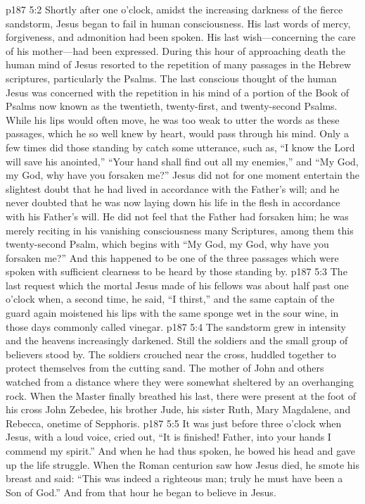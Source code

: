 \vs p187 5:2 Shortly after one o’clock, amidst the increasing darkness of the fierce sandstorm, Jesus began to fail in human consciousness. His last words of mercy, forgiveness, and admonition had been spoken. His last wish---concerning the care of his mother---had been expressed. During this hour of approaching death the human mind of Jesus resorted to the repetition of many passages in the Hebrew scriptures, particularly the Psalms. The last conscious thought of the human Jesus was concerned with the repetition in his mind of a portion of the Book of Psalms now known as the twentieth, twenty\hyp{}first, and twenty\hyp{}second Psalms. While his lips would often move, he was too weak to utter the words as these passages, which he so well knew by heart, would pass through his mind. Only a few times did those standing by catch some utterance, such as, \textcolor{ubdarkred}{“I know the Lord will save his anointed,” “Your hand shall find out all my enemies,”} and \textcolor{ubdarkred}{“My God, my God, why have you forsaken me?”} Jesus did not for one moment entertain the slightest doubt that he had lived in accordance with the Father’s will; and he never doubted that he was now laying down his life in the flesh in accordance with his Father’s will. He did not feel that the Father had forsaken him; he was merely reciting in his vanishing consciousness many Scriptures, among them this twenty\hyp{}second Psalm, which begins with “My God, my God, why have you forsaken me?” And this happened to be one of the three passages which were spoken with sufficient clearness to be heard by those standing by.
\pc \vs p187 5:3 The last request which the mortal Jesus made of his fellows was about half past one o’clock when, a second time, he said, \textcolor{ubdarkred}{“I thirst,”} and the same captain of the guard again moistened his lips with the same sponge wet in the sour wine, in those days commonly called vinegar.
\pc \vs p187 5:4 The sandstorm grew in intensity and the heavens increasingly darkened. Still the soldiers and the small group of believers stood by. The soldiers crouched near the cross, huddled together to protect themselves from the cutting sand. The mother of John and others watched from a distance where they were somewhat sheltered by an overhanging rock. When the Master finally breathed his last, there were present at the foot of his cross John Zebedee, his brother Jude, his sister Ruth, Mary Magdalene, and Rebecca, onetime of Sepphoris.
\vs p187 5:5 It was just before three o’clock when Jesus, with a loud voice, cried out, \textcolor{ubdarkred}{“It is finished! Father, into your hands I commend my spirit.”} And when he had thus spoken, he bowed his head and gave up the life struggle. When the Roman centurion saw how Jesus died, he smote his breast and said: “This was indeed a righteous man; truly he must have been a Son of God.” And from that hour he began to believe in Jesus.
